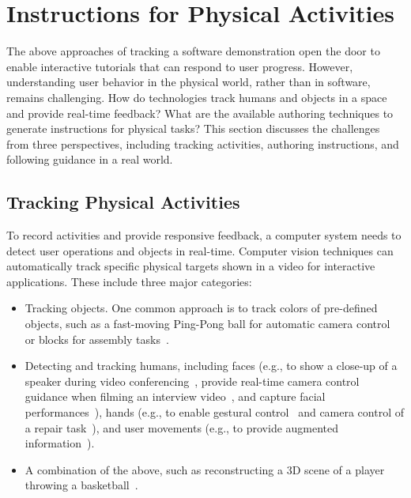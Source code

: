 


\section{Instructions for Physical Activities}
\label{related_physical}

The above approaches of tracking a software demonstration open the door to enable interactive tutorials that can respond to user progress. However, understanding user behavior in the physical world, rather than in software, remains challenging.
%
How do technologies track humans and objects in a space and provide real-time feedback? What are the available authoring techniques to generate instructions for physical tasks?
%
This section discusses the challenges from three perspectives, including tracking activities, authoring instructions, and following guidance in a real world.


\subsection{Tracking Physical Activities}
To record activities and provide responsive feedback, a computer system needs to detect user operations and objects in real-time.
%
Computer vision techniques can automatically track specific physical targets shown in a video for interactive applications. These include three major categories:

\begin{itemize}
  \item Tracking objects. One common approach is to track colors of pre-defined objects, such as a fast-moving Ping-Pong ball for automatic camera control~\cite{Okumura:2011tr} or blocks for assembly tasks~\cite{Gupta:2012ku}.
  \item Detecting and tracking humans, including faces (e.g., to show a close-up of a speaker during video conferencing~\cite{Ranjan:2010}, provide real-time camera control guidance when filming an interview video~\cite{Carter:2010}, and capture facial performances~\cite{Shi:2014:AAH:2661229.2661290,thies2016face}), hands (e.g., to enable gestural control~\cite{taylor-siggraph2016} and camera control of a repair task~\cite{Ranjan:2008}), and user movements (e.g., to provide augmented information~\cite{Wilson:2012fb,Anderson:2013:YEM:2501988.2502045}).
  \item A combination of the above, such as reconstructing a 3D scene of a player throwing a basketball~\cite{dou-siggraph2016}.
\end{itemize}

